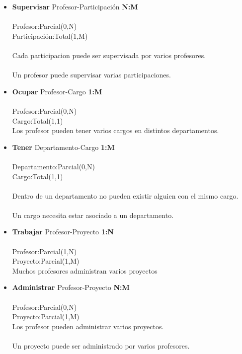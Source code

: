 \begin{itemize}
    \item \textbf{Supervisar} Profesor-Participación \textbf{N:M}\\ \\
    Profesor:Parcial(0,N)\\
    Participación:Total(1,M)\\ \\
Cada participacion puede ser supervisada por varios profesores.\\ \\
Un profesor puede supervisar varias participaciones.

    \item \textbf{Ocupar} Profesor-Cargo \textbf{1:M}\\ \\
    Profesor:Parcial(0,N)\\
    Cargo:Total(1,1)\\ 
    
    Los profesor pueden tener varios cargos en distintos departamentos.

    \item \textbf{Tener} Departamento-Cargo \textbf{1:M}\\ \\
    Departamento:Parcial(0,N)\\
    Cargo:Total(1,1)\\ \\
    Dentro de un departamento no pueden existir alguien con el mismo cargo.\\ \\
    Un cargo necesita estar asociado a un departamento.

    \item \textbf{Trabajar} Profesor-Proyecto \textbf{1:N}\\ \\
    Profesor:Parcial(1,N)\\
        Proyecto:Parcial(1,M)\\
    
    Muchos profesores administran varios proyectos
    \item \textbf{Administrar} Profesor-Proyecto \textbf{N:M}\\ \\
    Profesor:Parcial(0,N)\\
    Proyecto:Parcial(1,M)\\ 
    Los profesor pueden administrar varios proyectos.\\ \\
    Un proyecto puede ser administrado por varios profesores.
\end{itemize}
